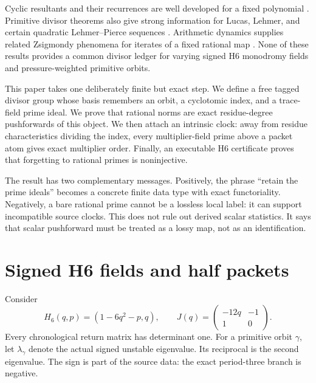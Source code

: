 \documentclass[11pt]{article}
\theoremstyle{definition}\newtheorem{definition}[theorem]{Definition}
\theoremstyle{remark}\newtheorem{remark}[theorem]{Remark}
\begin{document}
Cyclic resultants and their recurrences are well developed for a fixed
polynomial \cite{hillar2005cyclic,hillarlevine2007recurrences}.  Primitive
divisor theorems also give strong information for Lucas, Lehmer, and certain
quadratic Lehmer--Pierce sequences \cite{bhv2001,flatters2009}.  Arithmetic
dynamics supplies related Zsigmondy phenomena for iterates of a fixed
rational map \cite{ingramsilverman2009,silverman2012}.  None of these results
provides a common divisor ledger for varying signed H6 monodromy fields and
pressure-weighted primitive orbits.

This paper takes one deliberately finite but exact step.  We define a free
tagged divisor group whose basis remembers an orbit, a cyclotomic index, and
a trace-field prime ideal.  We prove that rational norms are exact
residue-degree pushforwards of this object.  We then attach an intrinsic
clock: away from residue characteristics dividing the index, every
multiplier-field prime above a packet atom gives exact multiplier order.
Finally, an executable H6 certificate proves that forgetting to rational
primes is noninjective.

The result has two complementary messages.  Positively, the phrase
``retain the prime ideals'' becomes a concrete finite data type with exact
functoriality.  Negatively, a bare rational prime cannot be a lossless local
label: it can support incompatible source clocks.  This does not rule out
derived scalar statistics.  It says that scalar pushforward must be treated
as a lossy map, not as an identification.

\section{Signed H6 fields and half packets}

Consider
\[
H_6(q,p)=(1-6q^2-p,q),
\qquad
J(q)=\begin{pmatrix}-12q&-1\\1&0\end{pmatrix}.
\]
Every chronological return matrix has determinant one.  For a primitive
orbit $\gamma$, let $\lambda_\gamma$ denote the actual signed unstable
eigenvalue.  Its reciprocal is the second eigenvalue.  The sign is part of
the source data: the exact period-three branch is negative.
\end{document}
